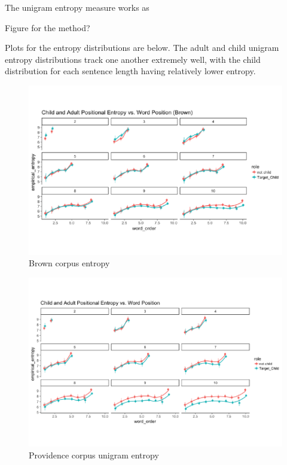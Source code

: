 \documentclass[10pt, letterpaper]{article}
\newenvironment{CodeChunk}{}{}
\begin{document}
The unigram entropy measure works as

Figure for the method?

Plots for the entropy distributions are below. The adult and child
unigram entropy distributions track one another extremely well, with the
child distribution for each sentence length having relatively lower
entropy.

\begin{CodeChunk}
\begin{figure}[h]

{\centering \includegraphics{figs/brown_PE-1} 

}

\caption[Brown corpus entropy]{Brown corpus entropy}\label{fig:brown_PE}
\end{figure}
\end{CodeChunk}

\begin{CodeChunk}
\begin{figure}[h]

{\centering \includegraphics{figs/providence_PE-1} 

}

\caption[Providence corpus unigram entropy]{Providence corpus unigram entropy}\label{fig:providence_PE}
\end{figure}
\end{CodeChunk}
\end{document}
